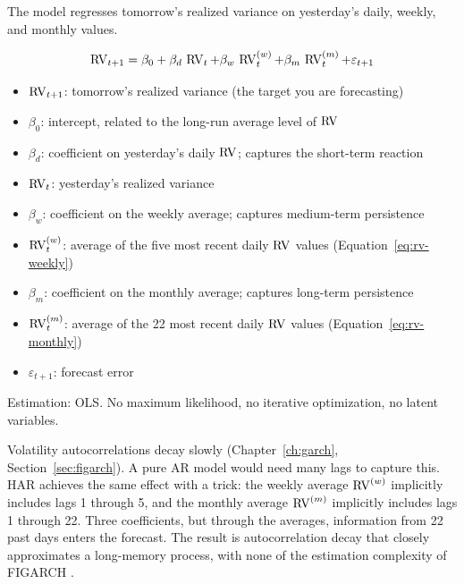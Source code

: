The model regresses tomorrow's realized variance on yesterday's daily, weekly, and monthly values.

\begin{definition}
\label{def:har}
\begin{equation}
  \operatorname{RV}_{t+1} = \beta_0 + \beta_d \, \operatorname{RV}_{t} + \beta_w \, \operatorname{RV}^{(w)}_{t} + \beta_m \, \operatorname{RV}^{(m)}_{t} + \varepsilon_{t+1}
  \label{eq:har}
\end{equation}
\begin{itemize}[nosep]
  \item $\operatorname{RV}_{t+1}$: tomorrow's realized variance (the target you are forecasting)
  \item $\beta_0$: intercept, related to the long-run average level of $\operatorname{RV}$
  \item $\beta_d$: coefficient on yesterday's daily $\operatorname{RV}$; captures the short-term reaction
  \item $\operatorname{RV}_t$: yesterday's realized variance
  \item $\beta_w$: coefficient on the weekly average; captures medium-term persistence
  \item $\operatorname{RV}^{(w)}_{t}$: average of the five most recent daily $\operatorname{RV}$ values (Equation~\ref{eq:rv-weekly})
  \item $\beta_m$: coefficient on the monthly average; captures long-term persistence
  \item $\operatorname{RV}^{(m)}_{t}$: average of the 22 most recent daily $\operatorname{RV}$ values (Equation~\ref{eq:rv-monthly})
  \item $\varepsilon_{t+1}$: forecast error
\end{itemize}
Estimation: OLS.
No maximum likelihood, no iterative optimization, no latent variables.
\end{definition}

\begin{intuition}
Volatility autocorrelations decay slowly (Chapter~\ref{ch:garch}, Section~\ref{sec:figarch}).
A pure AR model would need many lags to capture this.
HAR achieves the same effect with a trick: the weekly average $\operatorname{RV}^{(w)}$ implicitly includes lags 1 through 5, and the monthly average $\operatorname{RV}^{(m)}$ implicitly includes lags 1 through 22.
Three coefficients, but through the averages, information from 22 past days enters the forecast.
The result is autocorrelation decay that closely approximates a long-memory process, with none of the estimation complexity of FIGARCH \citep{Corsi2009}.
\end{intuition}

